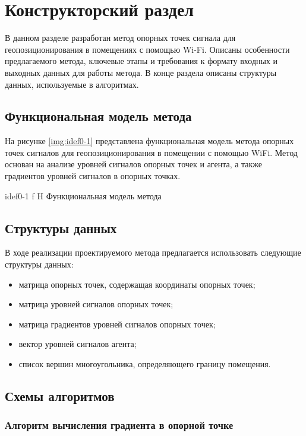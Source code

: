 \chapter{Конструкторский раздел}

В данном разделе разработан метод опорных точек сигнала для геопозиционирования в помещениях с помощью Wi-Fi. Описаны особенности предлагаемого метода, ключевые этапы и требования к формату входных и выходных данных для работы метода. В конце раздела описаны структуры данных, используемые в алгоритмах.

\section{Функциональная модель метода}

На рисунке \ref{img:idef0-1} представлена функциональная модель метода опорных точек сигналов для геопозиционирования в помещении с помощью WiFi. Метод основан на анализе уровней сигналов опорных точек и агента, а также градиентов уровней сигналов в опорных точках.

    {idef0-1}
    {f}
    {H}
    {\linewidth}
    {Функциональная модель метода}

\section{Структуры данных}

В ходе реализации проектируемого метода предлагается использовать следующие структуры данных:

\begin{itemize}[label=---]
    \item матрица опорных точек, содержащая координаты опорных точек;
    \item матрица уровней сигналов опорных точек;
    \item матрица градиентов уровней сигналов опорных точек;
    \item вектор уровней сигналов агента;
    \item список вершин многоугольника, определяющего границу помещения.
\end{itemize}

\section{Схемы алгоритмов}

\subsection{Алгоритм вычисления градиента в опорной точке}

